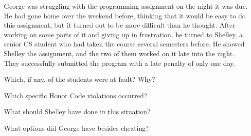 
George was struggling with the programming assignment on the night it was due.
He had gone home over the weekend before, thinking that it would be easy to do this assignment, but it turned out to be more difficult than he thought.
After working on some parts of it and giving up in frustration, he turned to Shelley, a senior CS student who had taken the course several semesters before.
He showed Shelley the assignment, and the two of them worked on it late into the night.
They successfully submitted the program with a late penalty of only one day.




\Q Which, if any, of the students were at fault? Why?

\begin{answer}[6em]
\end{answer}


\Q Which specific Honor Code violations occurred?

\begin{answer}[6em]
\end{answer}


\Q What should Shelley have done in this situation?

\begin{answer}[6em]
\end{answer}


\Q What options did George have besides cheating?

\begin{answer}[6em]
\end{answer}
